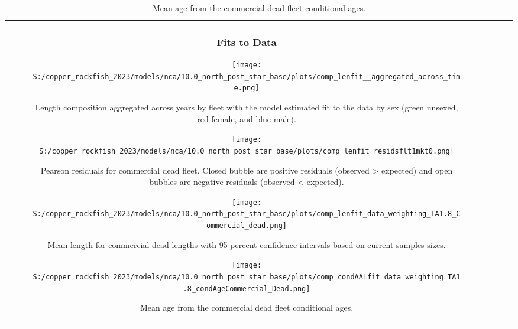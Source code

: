 \documentclass[11pt,
  letterpaper,
]{article}
\begin{document}
\begin{longtable}[t]{c>{\centering\arraybackslash}p{2cm}>{\centering\arraybackslash}p{2cm}>{\centering\arraybackslash}p{2cm}}
\pagebreak

\subsubsection{Fits to Data}\label{fits-to-data}

\begin{figure}
{\centering
\texttt{[image: S:/copper\_rockfish\_2023/models/nca/10.0\_north\_post\_star\_base/plots/comp\_lenfit\_\_aggregated\_across\_time.png]}
}
\caption{Length composition aggregated across years by fleet with the model estimated fit to the data by sex (green unsexed, red female, and blue male).\label{fig:len-agg-fit}}
\end{figure}

\pagebreak

\begin{figure}
{\centering
\texttt{[image: S:/copper\_rockfish\_2023/models/nca/10.0\_north\_post\_star\_base/plots/comp\_lenfit\_residsflt1mkt0.png]}
}
\caption{Pearson residuals for commercial dead fleet. Closed bubble are positive residuals (observed > expected) and open bubbles are negative residuals (observed < expected).\label{fig:com-dead-pearson}}
\end{figure}

\pagebreak

\begin{figure}
{\centering
\texttt{[image: S:/copper\_rockfish\_2023/models/nca/10.0\_north\_post\_star\_base/plots/comp\_lenfit\_data\_weighting\_TA1.8\_Commercial\_dead.png]}
}
\caption{Mean length for commercial dead lengths with 95 percent confidence intervals based on current samples sizes.\label{fig:com-dead-mean-len-fit}}
\end{figure}

\pagebreak

\begin{figure}
{\centering
\texttt{[image: S:/copper\_rockfish\_2023/models/nca/10.0\_north\_post\_star\_base/plots/comp\_condAALfit\_data\_weighting\_TA1.8\_condAgeCommercial\_Dead.png]}
}
\caption{Mean age from the commercial dead fleet conditional ages.\label{fig:com-dead-mean-age}}
\end{figure}


\end{longtable}
\end{document}
